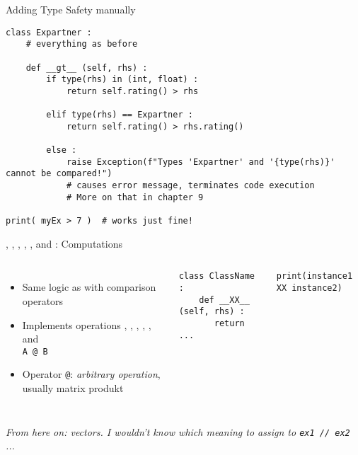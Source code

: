 
\begin{frame}[fragile]{Adding Type Safety manually}
%
\begin{codebox}
\begin{verbatim}
class Expartner :
    # everything as before
    
    def __gt__ (self, rhs) :
        if type(rhs) in (int, float) :
            return self.rating() > rhs
            
        elif type(rhs) == Expartner :
            return self.rating() > rhs.rating()
            
        else :
            raise Exception(f"Types 'Expartner' and '{type(rhs)}' cannot be compared!")
            # causes error message, terminates code execution
            # More on that in chapter 9

print( myEx > 7 )  # works just fine!
\end{verbatim}
\end{codebox}
%
\end{frame}


\begin{frame}[fragile]{, , , , ,  and : Computations}
%
\begin{columns}[T]
\begin{itemize}
\item Same logic as with comparison operators
\item Implements operations , , , , ,  and\\
 \texttt{A @ B}
\item Operator \texttt{@}: \emph{arbitrary operation}, usually matrix produkt
\end{itemize}
%
\begin{codebox}
\begin{verbatim}
class ClassName :
    def __XX__ (self, rhs) :
       return ...
\end{verbatim}
\end{codebox}
%
\begin{codebox}
\begin{verbatim}
print(instance1 XX instance2)
\end{verbatim}
\end{codebox}
\end{columns}
%
\vspace{6pt}
\emph{From here on: vectors. I wouldn't know which meaning to assign to \texttt{ex1 // ex2} ...}
%
\end{frame}

